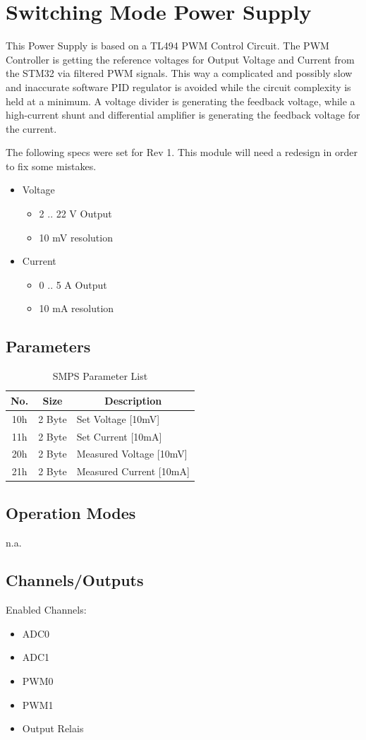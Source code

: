 \section{Switching Mode Power Supply}
This Power Supply is based on a TL494 PWM Control Circuit. The PWM Controller is getting the reference voltages for Output Voltage and Current from the STM32 via filtered PWM signals. This way a complicated and possibly slow and inaccurate software PID regulator is avoided while the circuit complexity is held at a minimum. A voltage divider is generating the feedback voltage, while a high-current shunt and differential amplifier is generating the feedback voltage for the current. 

The following specs were set for Rev 1. This module will need a redesign in order to fix some mistakes.

\begin{itemize}
	\item Voltage
	\begin{itemize}
		\item 2 .. 22 V Output
		\item 10 mV resolution
	\end{itemize}
	\item Current
	\begin{itemize}
		\item 0 .. 5 A Output
		\item 10 mA resolution
	\end{itemize}
\end{itemize}

\subsection{Parameters}
\begin{table}[H]
    \centering
    \begin{tabular}{|c|c|l|}
        \hline
        \textbf{No.}   &   \textbf{Size} & \multicolumn{1}{|c|}{\textbf{Description}}\\ \hline \hline
        10h   &  2 Byte &  Set Voltage [10mV]\\ \hline
		11h   &  2 Byte &  Set Current [10mA]\\ \hline
		20h   &  2 Byte &  Measured Voltage [10mV]\\ \hline
		21h   &  2 Byte &  Measured Current [10mA]\\ \hline
    \end{tabular}
	\caption{SMPS Parameter List}
\label{tab:Par-SMPS}
\end{table}

\subsection{Operation Modes}
n.a.
\subsection{Channels/Outputs}
Enabled Channels:
\begin{itemize}
	\item ADC0
	\item ADC1
	\item PWM0
	\item PWM1
	\item Output Relais
\end{itemize}